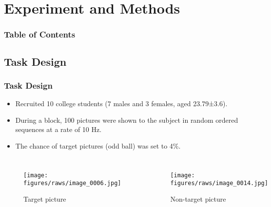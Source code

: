 \documentclass[aspectratio=169]{beamer}
\begin{document}
\section{Experiment and Methods}
\begin{frame}[plain]
    \frametitle{Table of Contents}
\end{frame}

\subsection{Task Design}
\begin{frame}
    \frametitle{Task Design}
    \begin{itemize}
        \item Recruited 10 college students (7 males and 3 females, aged 23.79±3.6).
        \item During a block, 100 pictures were shown to the subject in random ordered sequences at a rate of 10 Hz.
        \item The chance of target pictures (odd ball) was set to 4\%.
    \end{itemize}

    \begin{columns}
        \begin{figure}[h]
            \centering
            \texttt{[image: figures/raws/image\_0006.jpg]}
            \caption{Target picture}
        \end{figure}

        \begin{figure}[h]
            \centering
            \texttt{[image: figures/raws/image\_0014.jpg]}
            \caption{Non-target picture}
        \end{figure}

    \end{columns}
\end{frame}
\end{document}
